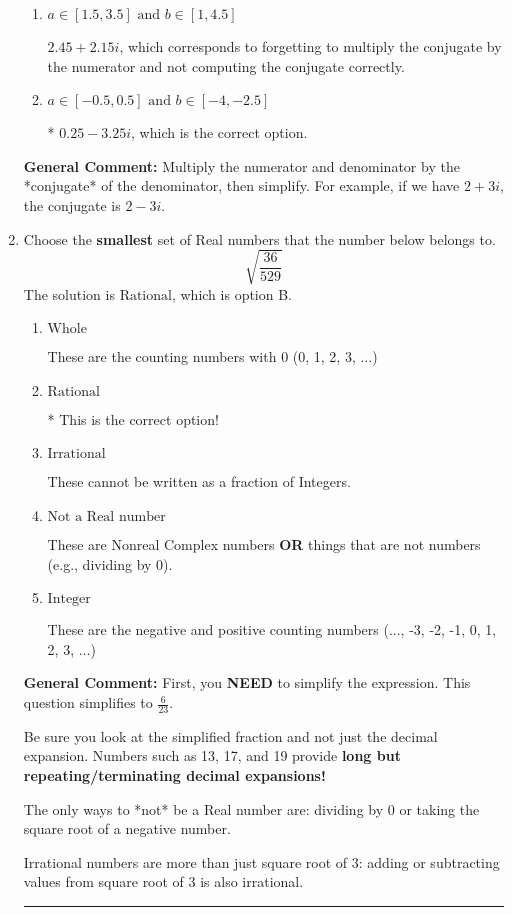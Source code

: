 \documentclass{extbook}[14pt]
\newcommand{\litem}[1]{\item #1

\rule{\textwidth}{0.4pt}}
\begin{document}
\begin{enumerate}
{\begin{enumerate}[label=\Alph*.]
 $20.00  - 3.25 i$, which corresponds to forgetting to multiply the conjugate by the numerator and using a plus instead of a minus in the denominator.
\item \( a \in [1.5, 3.5] \text{ and } b \in [1, 4.5] \)

 $2.45  + 2.15 i$, which corresponds to forgetting to multiply the conjugate by the numerator and not computing the conjugate correctly.
\item \( a \in [-0.5, 0.5] \text{ and } b \in [-4, -2.5] \)

* $0.25  - 3.25 i$, which is the correct option.
\end{enumerate}

\textbf{General Comment:} Multiply the numerator and denominator by the *conjugate* of the denominator, then simplify. For example, if we have $2+3i$, the conjugate is $2-3i$.
}
\litem{
Choose the \textbf{smallest} set of Real numbers that the number below belongs to.
\[ \sqrt{\frac{36}{529}} \]The solution is \( \text{Rational} \), which is option B.\begin{enumerate}[label=\Alph*.]
\item \( \text{Whole} \)

These are the counting numbers with 0 (0, 1, 2, 3, ...)
\item \( \text{Rational} \)

* This is the correct option!
\item \( \text{Irrational} \)

These cannot be written as a fraction of Integers.
\item \( \text{Not a Real number} \)

These are Nonreal Complex numbers \textbf{OR} things that are not numbers (e.g., dividing by 0).
\item \( \text{Integer} \)

These are the negative and positive counting numbers (..., -3, -2, -1, 0, 1, 2, 3, ...)
\end{enumerate}

\textbf{General Comment:} First, you \textbf{NEED} to simplify the expression. This question simplifies to $\frac{6}{23}$. 
 
 Be sure you look at the simplified fraction and not just the decimal expansion. Numbers such as 13, 17, and 19 provide \textbf{long but repeating/terminating decimal expansions!} 
 
 The only ways to *not* be a Real number are: dividing by 0 or taking the square root of a negative number. 
 
 Irrational numbers are more than just square root of 3: adding or subtracting values from square root of 3 is also irrational.
}
\end{enumerate}
\end{document}
